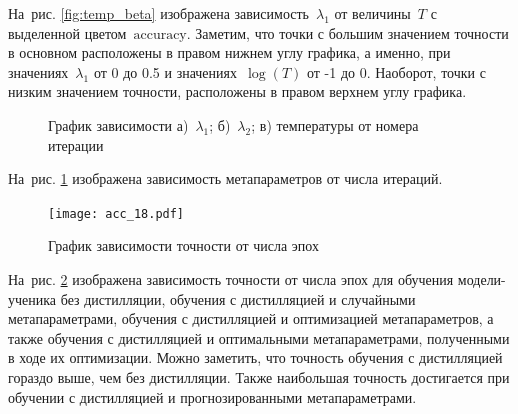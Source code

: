 \documentclass[12pt, twoside]{article}
\begin{document}
На~рис. \ref{fig:temp_beta} изображена зависимость~$\lambda_1$ от величины~$T$ с выделенной цветом~$\text{accuracy}$. Заметим, что точки с большим значением точности в основном расположены в правом нижнем углу графика, а именно, при значениях~$\lambda_1$ от 0 до 0.5 и значениях~$\log(T)$ от -1 до 0. Наоборот, точки с низким значением точности, расположены в правом верхнем углу графика.

\begin{figure}[!ht]
\begin{minipage}[h]{0.5\linewidth}
\end{minipage}
\begin{minipage}[h]{0.5\linewidth}
\end{minipage}
\caption{График зависимости а)~$\lambda_1$; б)~$\lambda_2$; в) температуры от номера итерации}
\label{fig:meta_iter_cifar}
\end{figure}

На~рис. \ref{fig:meta_iter_cifar} изображена зависимость метапараметров от числа итераций. 

\begin{figure}[!ht]
\centering
\texttt{[image: acc\_18.pdf]}
\caption{График зависимости точности от числа эпох}
\label{fig:acc_epoch}
\end{figure}

На~рис. \ref{fig:acc_epoch} изображена зависимость точности от числа эпох для обучения модели-ученика без дистилляции, обучения с дистилляцией и случайными метапараметрами, обучения с дистилляцией и оптимизацией метапараметров, а также обучения с дистилляцией и оптимальными метапараметрами, полученными в ходе их оптимизации. Можно заметить, что точность обучения с дистилляцией гораздо выше, чем без дистилляции. Также наибольшая точность достигается при обучении с дистилляцией и прогнозированными метапараметрами.

\end{document}
